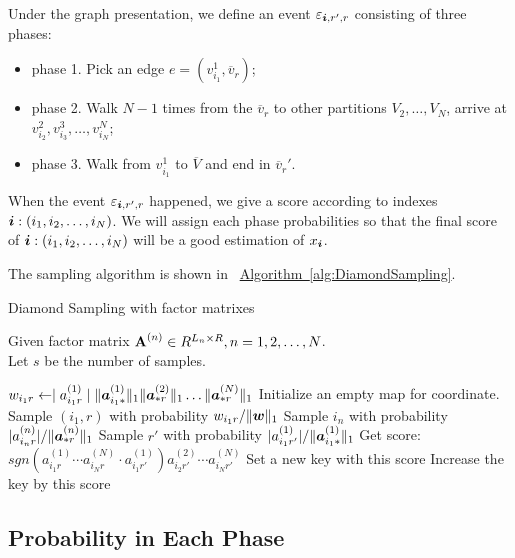 \documentclass[letterpaper]{article}
\newcommand{\Sca}[3]{{#1}^{(#2)}_{i_#2#3}}%
\newcommand{\V}[1]{{\bm{{\MakeLowercase{#1}}}}}
\newcommand{\Varow}[1]{\V{a}^{(#1)}_{i_#1*}}
\newcommand{\Vacol}[1]{\V{a}^{(#1)}_{*r}}
\newcommand{\M}[1]{{\bm{\mathbf{\MakeUppercase{#1}}}}}
\newcommand{\norm}[2]{\|#1\|_{#2}}
\newcommand{\Alg}[1] {\hyperref[alg:#1] {Algorithm~\ref*{alg:#1}}}
\begin{document}
Under the graph presentation, we define an event $\varepsilon_{\V{i},r',r}$  consisting of three phases:
\begin{itemize}
  \item phase 1. Pick an edge $e=(v^1_{i_1},\overline{v}_r)$;
  \item phase 2. Walk $N-1$ times from the $\overline{v}_r$ to other partitions $V_2,\ldots,V_N$, arrive at $v^2_{i_2},v^3_{i_3},\ldots,v^N_{i_N}$;
  \item phase 3. Walk from $v^1_{i_1}$ to $\overline{V}$ and end in $\overline{v}_r'$.
\end{itemize}

When the event $\varepsilon_{\V{i},r',r}$ happened, we give a score according to indexes $\V{i}:(i_1,i_2,\ldots,i_N)$. We will assign each phase probabilities so that the final score of $\V{i}:(i_1,i_2,\ldots,i_N)$ will be a good estimation of $x_{\V{i}}$.

The sampling algorithm is shown in ~\Alg{DiamondSampling}.

\begin{algorithm}[t]
    \caption{Diamond Sampling with factor matrixes}
    \label{alg:DiamondSampling}
    Given factor matrix $\M{A}^{(n)}\in R^{L_n\times R}, n = 1,2,\ldots,N$.\\
    Let $s$ be the number of samples.
    \begin{algorithmic}[1]
    \State $w_{i_1r} \leftarrow \mid \Sca{a}{1}{r}\mid
    \norm{\Varow{1}}{1}\norm{\Vacol{2}}{1}\ldots\norm{\Vacol{N}}{1} $
    \EndFor
    \State Initialize an empty map for coordinate.
    \State Sample $(i_1,r)$ with probability $w_{i_1r}/\norm{\V{W}}{1}$        \label{line:phase1}
    \State Sample $i_n$ with probability $|\Sca{a}{n}{r}|/\norm{\Vacol{n}}{1}$
    \label{line:phase2}
    \EndFor
    \State Sample $r'$ with probability $|\Sca{a}{1}{r'}|/\norm{\Varow{1}}{1}$
    \label{line:phase3}
    \State \label{line:scoring}
        Get score: $sgn(\Sca{a}{1}{r}\cdots\Sca{a}{N}{r}\cdot\Sca{a}{1}{r'})
    \Sca{a}{2}{r'}\cdots\Sca{a}{N}{r'}$
    \State  Set a new key with this score
    \Else
    \State Increase the key by this score
    \EndIf
    \EndFor
    \end{algorithmic}
\end{algorithm}

\subsection{Probability in Each Phase}
\end{document}
